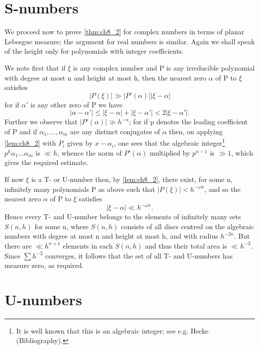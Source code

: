 \section{S-numbers}\label{sec:ch8_5}

We proceed now to prove \autoref{thm:ch8_2} for complex numbers in terms of planar Lebesgue measure; the argument for real numbers is similar. Again we shall speak of the height only for polynomials with integer coefficients.

We note first that if $\xi$ is any complex number and P is any irreducible polynomial with degree at most n and height at most h, then the nearest zero $\alpha$ of P to $\xi$ satisfies
\[|P(\xi)| \gg |P'(\alpha)| |\xi - \alpha| \tag{14}\label{eq:ch8_14}\]
for if $\alpha'$ is any other zero of P we have
\[|\alpha-\alpha'| \le |\xi-\alpha| + |\xi-\alpha'| < 2|\xi-\alpha'|.\]
Further we observe that $|P'(\alpha)| \gg h^{-n}$; for if p denotes the leading coefficient of P and if $\alpha_1, \dots, \alpha_m$ are any distinct conjugates of $\alpha$ then, on applying \autoref{lem:ch8_2} with $P_i$ given by $x-\alpha_i$, one sees that the algebraic integer\footnote{It is well known that this is an algebraic integer; see e.g. Hecke (Bibliography).} $p^k \alpha_1 \dots \alpha_m$ is $\ll h$, whence the norm of $P'(\alpha)$ multiplied by $p^{n-1}$ is $\gg 1$, which gives the required estimate.

If now $\xi$ is a T- or U-number then, by \autoref{lem:ch8_2}, there exist, for some n, infinitely many polynomials P as above such that $|P(\xi)| < h^{-\omega n}$, and so the nearest zero $\alpha$ of P to $\xi$ satisfies
\[|\xi-\alpha| \ll h^{-\omega n}.\]
Hence every T- and U-number belongs to the elements of infinitely many sets $S(n, h)$ for some n, where $S(n, h)$ consists of all discs centred on the algebraic numbers with degree at most n and height at most h, and with radius $h^{-2n}$. But there are $\ll h^{n+1}$ elements in each $S(n, h)$ and thus their total area is $\ll h^{-2}$. Since $\sum h^{-2}$ converges, it follows that the set of all T- and U-numbers has measure zero, as required.

\section{U-numbers}\label{sec:ch8_6}

